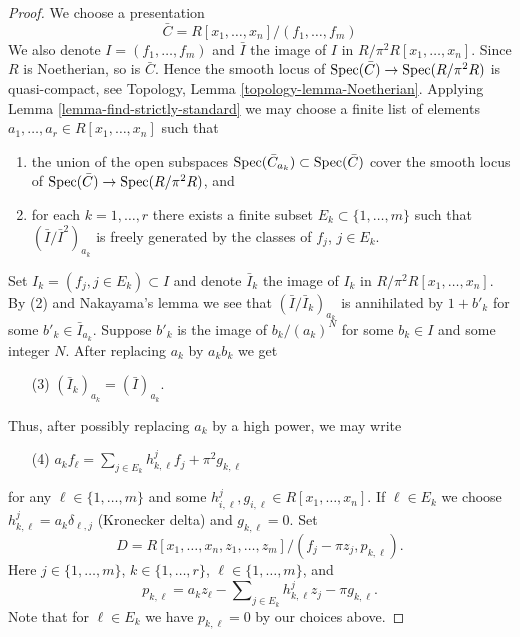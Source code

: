 \begin{proof}
We choose a presentation
$$
\bar C = R[x_1, \ldots, x_n]/(f_1, \ldots, f_m)
$$
We also denote $I = (f_1, \ldots, f_m)$ and $\bar I$ the image of
$I$ in $R/\pi^2R[x_1, \ldots, x_n]$. Since $R$ is Noetherian, so is
$\bar C$. Hence the smooth locus of $\mathop{\rm Spec}(\bar C) \to \mathop{\rm Spec}(R/\pi^2R)$
is quasi-compact, see
Topology, Lemma \ref{topology-lemma-Noetherian}.
Applying
Lemma \ref{lemma-find-strictly-standard}
we may choose a finite list of elements
$a_1, \ldots, a_r \in R[x_1, \ldots, x_n]$ such that
\begin{enumerate}
\item the union of the open subspaces
$\mathop{\rm Spec}(\bar C_{a_k}) \subset \mathop{\rm Spec}(\bar C)$
cover the smooth locus of $\mathop{\rm Spec}(\bar C) \to \mathop{\rm Spec}(R/\pi^2R)$, and
\item for each $k = 1, \ldots, r$ there exists a finite subset
$E_k \subset \{1, \ldots, m\}$ such that
$(\bar I/\bar I^2)_{a_k}$ is freely generated by the classes of
$f_j$, $j \in E_k$.
\end{enumerate}
Set $I_k = (f_j, j \in E_k) \subset I$ and denote $\bar I_k$ the
image of $I_k$ in $R/\pi^2R[x_1, \ldots, x_n]$.
By (2) and Nakayama's lemma we see that $(\bar I/\bar I_k)_{a_k}$
is annihilated by $1 + b'_k$ for some $b'_k \in \bar I_{a_k}$.
Suppose $b'_k$ is the image of $b_k/(a_k)^N$ for some $b_k \in I$
and some integer $N$. After replacing $a_k$ by $a_kb_k$ we get
\begin{enumerate}
\item[(3)] $(\bar I_k)_{a_k} = (\bar I)_{a_k}$.
\end{enumerate}
Thus, after possibly replacing $a_k$ by a high power, we may write
\begin{enumerate}
\item[(4)]
$a_k f_\ell = \sum\nolimits_{j \in E_k} h_{k, \ell}^jf_j + \pi^2 g_{k, \ell}$
\end{enumerate}
for any $\ell \in \{1, \ldots, m\}$ and some
$h_{i, \ell}^j, g_{i, \ell} \in R[x_1, \ldots, x_n]$.
If $\ell \in E_k$ we choose $h_{k, \ell}^j = a_k\delta_{\ell, j}$
(Kronecker delta) and $g_{k, \ell} = 0$. Set
$$
D = R[x_1, \ldots, x_n, z_1, \ldots, z_m]/
(f_j - \pi z_j, p_{k, \ell}).
$$
Here $j \in \{1, \ldots, m\}$, $k \in \{1, \ldots, r\}$,
$\ell \in \{1, \ldots, m\}$, and
$$
p_{k, \ell} = a_k z_\ell - \sum\nolimits_{j \in E_k} h_{k, \ell}^j z_j
- \pi g_{k, \ell}.
$$
Note that for $\ell \in E_k$ we have $p_{k, \ell} = 0$ by our choices above.


\end{proof}
